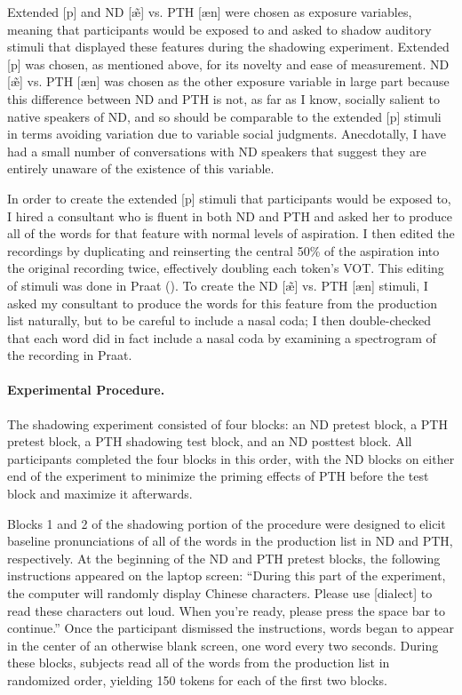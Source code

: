 Extended [p] and ND [\~{\ae}] vs. PTH [\ae n] were chosen as exposure variables, meaning that participants would be exposed to and asked to shadow auditory stimuli that displayed these features during the shadowing experiment. Extended [p] was chosen, as mentioned above, for its novelty and ease of measurement. ND [\~{\ae}] vs. PTH [\ae n] was chosen as the other exposure variable in large part because this difference between ND and PTH is not, as far as I know, socially salient to native speakers of ND, and so should be comparable to the extended [p] stimuli in terms avoiding variation due to variable social judgments. Anecdotally, I have had a small number of conversations with ND speakers that suggest they are entirely unaware of the existence of this variable.


In order to create the extended [p] stimuli that participants would be exposed to, I hired a consultant who is fluent in both ND and PTH and asked her to produce all of the words for that feature with normal levels of aspiration. I then edited the recordings by duplicating and reinserting the central 50\% of the aspiration into the original recording twice, effectively doubling each token’s VOT. This editing of stimuli was done in Praat (\cite{praat}). To create the ND [\~{\ae}] vs. PTH [\ae n] stimuli, I asked my consultant to produce the words for this feature from the production list naturally, but to be careful to include a nasal coda; I then double-checked that each word did in fact include a nasal coda by examining a spectrogram of the recording in Praat.

\paragraph{Experimental Procedure.}
\label{para:shadowingProcedure}
The shadowing experiment consisted of four blocks: an ND pretest block, a PTH pretest block, a PTH shadowing test block, and an ND posttest block. All participants completed the four blocks in this order, with the ND blocks on either end of the experiment to minimize the priming effects of PTH before the test block and maximize it afterwards.

Blocks 1 and 2 of the shadowing portion of the procedure were designed to elicit baseline pronunciations of all of the words in the production list in ND and PTH, respectively. At the beginning of the ND and PTH pretest blocks, the following instructions appeared on the laptop screen: ``During this part of the experiment, the computer will randomly display Chinese characters. Please use [dialect] to read these characters out loud. When you're ready, please press the space bar to continue.'' Once the participant dismissed the instructions, words began to appear in the center of an otherwise blank screen, one word every two seconds. During these blocks, subjects read all of the words from the production list in randomized order, yielding 150 tokens for each of the first two blocks.  

